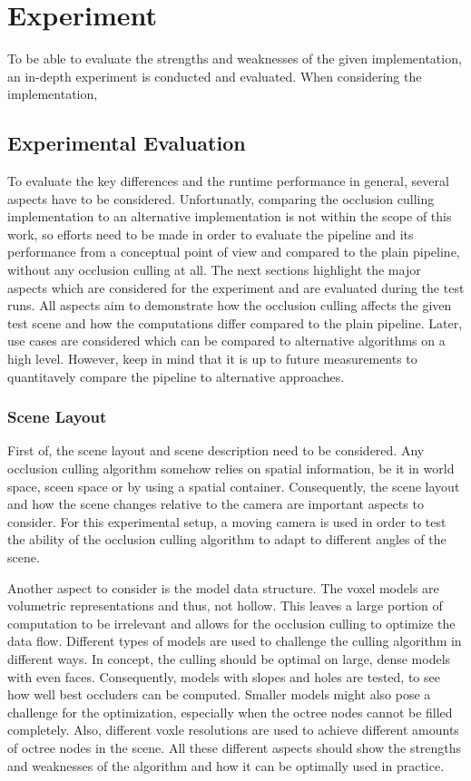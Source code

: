\chapter{Experiment} \label{cpt-experiment}

To be able to evaluate the strengths and weaknesses of the given implementation, an in-depth 
experiment is conducted and evaluated. When considering the implementation, 


\section{Experimental Evaluation} \label{sec-experimental-evaluation}

To evaluate the key differences and the runtime performance in general, several aspects have to be considered.
Unfortunatly, comparing the occlusion culling implementation to an alternative implementation is not within the 
scope of this work, so efforts need to be made in order to evaluate the pipeline and its performance from a 
conceptual point of view and compared to the plain pipeline, without any occlusion culling at all. The next  
sections highlight the major aspects which are considered for the experiment and are evaluated during the 
test runs. All aspects aim to demonstrate how the occlusion culling affects the given test scene and how the 
computations differ compared to the plain pipeline. Later, use cases are considered which can be compared to 
alternative algorithms on a high level. However, keep in mind that it is up to future measurements to quantitavely
compare the pipeline to alternative approaches. 


\subsection*{Scene Layout}

First of, the scene layout and scene description need to be considered. Any occlusion culling algorithm somehow 
relies on spatial information, be it in world space, sceen space or by using a spatial container. Consequently, 
the scene layout and how the scene changes relative to the camera are important aspects to consider. For this 
experimental setup, a moving camera is used in order to test the ability of the occlusion culling algorithm to 
adapt to different angles of the scene. 

Another aspect to consider is the model data structure. The voxel models are volumetric representations and thus, 
not hollow. This leaves a large portion of computation to be irrelevant and allows for the occlusion culling to 
optimize the data flow. Different types of models are used to challenge the culling algorithm in different ways. 
In concept, the culling should be optimal on large, dense models with even faces. Consequently, models with 
slopes and holes are tested, to see how well best occluders can be computed. Smaller models might also pose a 
challenge for the optimization, especially when the octree nodes cannot be filled completely. Also, different 
voxle resolutions are used to achieve different amounts of octree nodes in the scene. All these different 
aspects should show the strengths and weaknesses of the algorithm and how it can be optimally used in practice.


